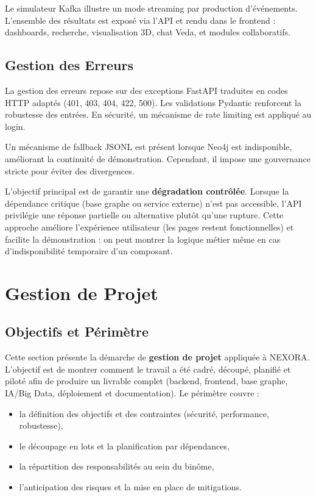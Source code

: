 \documentclass[12pt,a4paper]{report}
\begin{document}
Le simulateur Kafka illustre un mode streaming par production d'événements. L'ensemble des résultats est exposé via l'API et rendu dans le frontend : dashboards, recherche, visualisation 3D, chat Veda, et modules collaboratifs.

\section{Gestion des Erreurs}
La gestion des erreurs repose sur des exceptions FastAPI traduites en codes HTTP adaptés (401, 403, 404, 422, 500). Les validations Pydantic renforcent la robustesse des entrées. En sécurité, un mécanisme de rate limiting est appliqué au login.

Un mécanisme de fallback JSONL est présent lorsque Neo4j est indisponible, améliorant la continuité de démonstration. Cependant, il impose une gouvernance stricte pour éviter des divergences.

L'objectif principal est de garantir une \textbf{dégradation contrôlée}. Lorsque la dépendance critique (base graphe ou service externe) n'est pas accessible, l'API privilégie une réponse partielle ou alternative plutôt qu'une rupture. Cette approche améliore l'expérience utilisateur (les pages restent fonctionnelles) et facilite la démonstration : on peut montrer la logique métier même en cas d'indisponibilité temporaire d'un composant.

\clearpage
\chapter{Gestion de Projet}

\section{Objectifs et Périmètre}
Cette section présente la démarche de \textbf{gestion de projet} appliquée à NEXORA. L'objectif est de montrer comment le travail a été cadré, découpé, planifié et piloté afin de produire un livrable complet (backend, frontend, base graphe, IA/Big Data, déploiement et documentation). Le périmètre couvre :

\begin{itemize}
  \item la définition des objectifs et des contraintes (sécurité, performance, robustesse),
  \item le découpage en lots et la planification par dépendances,
  \item la répartition des responsabilités au sein du binôme,
  \item l'anticipation des risques et la mise en place de mitigations.
\end{itemize}
\end{document}
